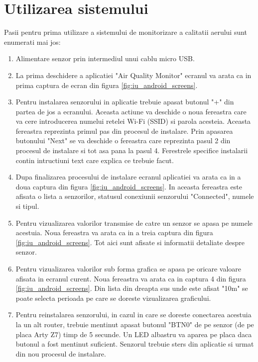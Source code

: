 \section{Utilizarea sistemului}\label{sec:iu_utilizare_sistem}
Pasii pentru prima utilizare a sistemului de monitorizare a calitatii aerului sunt enumerati mai jos:
\begin{enumerate}
    \item Alimentare senzor prin intermediul unui cablu micro USB.
    \item La prima deschidere a aplicatiei "Air Quality Monitor" ecranul va arata ca in prima captura de ecran din figura \ref{fig:iu_android_screens}.
    \item Pentru instalarea senzorului in aplicatie trebuie apasat butonul "+" din partea de jos a ecranului. Aceasta actiune va deschide o noua fereastra care va cere 
    introducerea numelui retelei Wi-Fi (SSID) si parola acesteia. Aceasta fereastra reprezinta primul pas din procesul de instalare. Prin apasarea butonului "Next" 
    se va deschide o fereastra care reprezinta pasul 2 din procesul de instalare si tot asa pana la pasul 4. Ferestrele specifice instalarii contin intructiuni text care explica 
    ce trebuie facut.
    \item Dupa finalizarea procesului de instalare ecranul aplicatiei va arata ca in a doua captura din figura \ref{fig:iu_android_screens}. In aceasta fereastra este afisata o 
    lista a senzorilor, statusul conexiunii senzorului "Connected", numele si tipul.
    \item Pentru vizualizarea valorilor transmise de catre un senzor se apasa pe numele acestuia. Noua fereastra va arata ca in a treia captura din figura 
    \ref{fig:iu_android_screens}. Tot aici sunt afisate si informatii detaliate despre senzor.
    \item Pentru vizualizarea valorilor sub forma grafica se apasa pe oricare valoare afisata in ecranul curent. Noua fereastra va arata ca in captura 4 din figura 
    \ref{fig:iu_android_screens}. Din lista din dreapta sus unde este afisat "10m" se poate selecta perioada pe care se doreste vizualizarea graficului.
    \item Pentru reinstalarea senzorului, in cazul in care se doreste conectarea acestuia la un alt router, trebuie mentinut apasat butonul "BTN0" de pe senzor (de pe 
    placa Arty Z7) timp de 5 secunde. Un LED albastru va aparea pe placa daca butonul a fost mentinut suficient. Senzorul trebuie sters din aplicatie si urmat din nou 
    procesul de instalare.
\end{enumerate}

